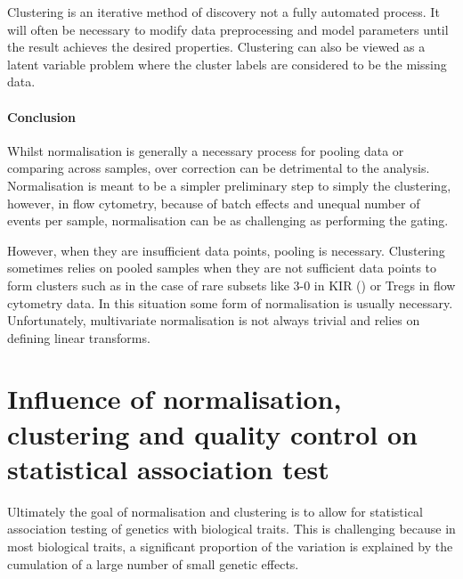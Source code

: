 Clustering is an iterative method of discovery not a fully automated process.
It will often be necessary to modify data preprocessing and model parameters until the result achieves the desired properties.  
Clustering can also be viewed as a latent variable problem where the cluster labels are considered to be the missing data.

\paragraph{Conclusion}

Whilst normalisation is generally a necessary process for pooling data or comparing across samples, over correction can be detrimental to the analysis.
Normalisation is meant to be a simpler preliminary step to simply the clustering,
however, in flow cytometry, because of batch effects and unequal number of events per sample, normalisation can be as challenging as performing the gating.

However, when they are insufficient data points, pooling is necessary.
Clustering sometimes relies on pooled samples when they are not sufficient data points
to form clusters such as in the case of rare subsets like 3-0 in KIR () or Tregs in flow cytometry data.
In this situation some form of normalisation is usually necessary.
Unfortunately, multivariate normalisation is not always trivial and relies on defining linear transforms. 


\section{ Influence of normalisation, clustering and quality control on statistical association test }

Ultimately the goal of normalisation and clustering is to allow for statistical association testing of genetics with biological traits.
This is challenging because in most biological traits, a significant proportion of the variation is explained by the cumulation of a large number of small genetic effects.

